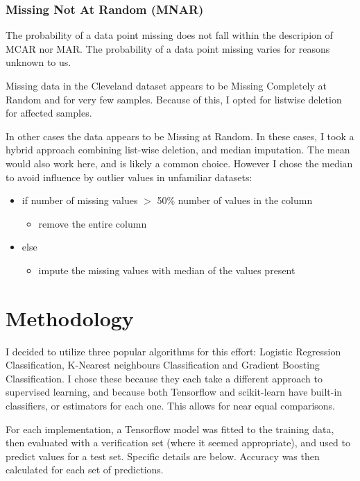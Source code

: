 \documentclass[conference]{IEEEtran}
\begin{document}
\subsubsection{Missing Not At Random (MNAR)}
The probability of a data point missing does not fall within the descripion of MCAR nor MAR. The probability of a data point missing varies for reasons unknown to us. 

Missing data in the Cleveland dataset appears to be Missing Completely at Random and for very few samples. Because of this, I opted for listwise deletion for affected samples.

In other cases the data appears to be Missing at Random. In these cases, I took a hybrid approach combining list-wise deletion, and median imputation\cite{b12}. The mean would also work here, and is likely a common choice. However I chose the median to avoid influence by outlier values in unfamiliar datasets:
\begin{itemize}
    \item if number of missing values $>$ 50\% number of values in the column
    \begin{itemize} 
    \item remove the entire column
    \end{itemize}
    \item else
    \begin{itemize} 
    \item impute the missing values with median of the values present
    \end{itemize}
\end{itemize}


\section{Methodology}
I decided to utilize three popular algorithms for this effort: Logistic Regression Classification, K-Nearest neighbours Classification and Gradient Boosting Classification. I chose these because they each take a different approach to supervised learning, and because both Tensorflow and scikit-learn have built-in classifiers, or estimators for each one. This allows for near equal comparisons.

For each implementation, a Tensorflow model was fitted to the training data, then evaluated with a verification set (where it seemed appropriate), and used to predict values for a test set. Specific details are below. Accuracy was then calculated for each set of predictions.
\end{document}
